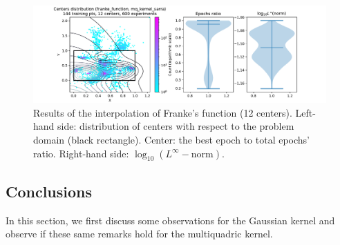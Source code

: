 \documentclass[12pt]{report} %
\begin{document}
\begin{figure}[H]
  \includegraphics[width=\textwidth, trim={2cm 0 2.8cm 0}, clip=true]{imagenes/experiments/2d/franke_interpolation/tr12_c12_franke_function_mq_kernel_sarra.pdf}
  \caption{Results of the interpolation of Franke's function (12 centers).
    Left-hand side: distribution of centers with respect to the problem domain (black rectangle). Center: the best epoch to total epochs' ratio.
    Right-hand side: $\log_{10}(L^\infty-\text{norm})$.}
  \label{fig:franke-tr12-c12-mq}
\end{figure}

\subsection*{Conclusions}

In this section, we first discuss some observations for the Gaussian kernel and observe
if these same remarks hold for the multiquadric kernel.
\end{document}
